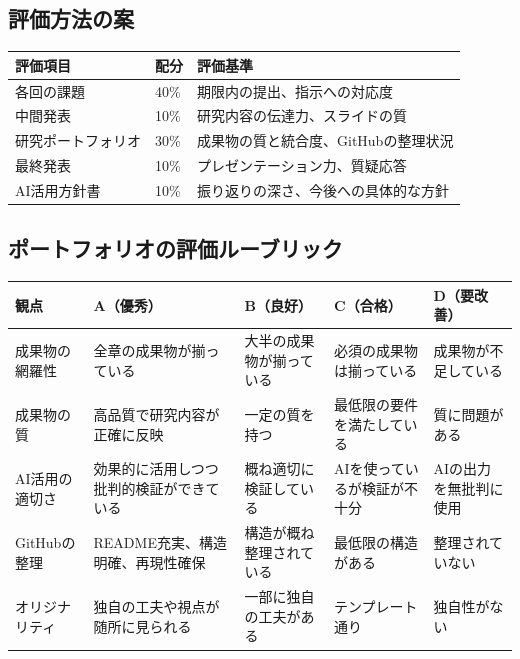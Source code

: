 \subsection*{評価方法の案}

\begin{table}[H]
\centering
\small
\begin{tabular}{llp{6cm}}
\toprule
評価項目 & 配分 & 評価基準 \\
\midrule
各回の課題 & 40\% & 期限内の提出、指示への対応度 \\
中間発表 & 10\% & 研究内容の伝達力、スライドの質 \\
研究ポートフォリオ & 30\% & 成果物の質と統合度、GitHubの整理状況 \\
最終発表 & 10\% & プレゼンテーション力、質疑応答 \\
AI活用方針書 & 10\% & 振り返りの深さ、今後への具体的な方針 \\
\bottomrule
\end{tabular}
\end{table}

\subsection*{ポートフォリオの評価ルーブリック}

\begin{table}[H]
\centering
\footnotesize
\begin{tabular}{lp{1.8cm}p{1.8cm}p{1.8cm}p{1.8cm}}
\toprule
観点 & A（優秀） & B（良好） & C（合格） & D（要改善） \\
\midrule
成果物の網羅性 & 全章の成果物が揃っている & 大半の成果物が揃っている & 必須の成果物は揃っている & 成果物が不足している \\
\hline
成果物の質 & 高品質で研究内容が正確に反映 & 一定の質を持つ & 最低限の要件を満たしている & 質に問題がある \\
\hline
AI活用の適切さ & 効果的に活用しつつ批判的検証ができている & 概ね適切に検証している & AIを使っているが検証が不十分 & AIの出力を無批判に使用 \\
\hline
GitHubの整理 & README充実、構造明確、再現性確保 & 構造が概ね整理されている & 最低限の構造がある & 整理されていない \\
\hline
オリジナリティ & 独自の工夫や視点が随所に見られる & 一部に独自の工夫がある & テンプレート通り & 独自性がない \\
\bottomrule
\end{tabular}
\end{table}

